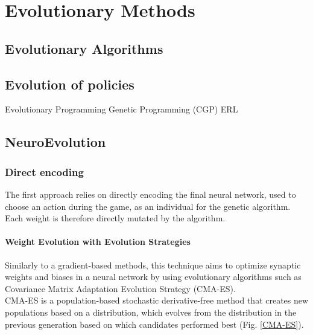 \chapter{Evolutionary Methods }
\label{sec:evo}

\section{Evolutionary Algorithms}

\section{Evolution of policies}
Evolutionary Programming
Genetic Programming (CGP)
ERL

\section{NeuroEvolution}
\subsection{Direct encoding}
The first approach relies on directly encoding the final neural network, used to choose an action during the game, as an individual for the genetic algorithm. Each weight is therefore directly mutated by the algorithm.

\subsubsection{Weight Evolution with Evolution Strategies}
Similarly to a gradient-based methods, this technique aims to optimize synaptic weights and biases in a neural network by using evolutionary algorithms such as Covariance Matrix Adaptation Evolution Strategy (CMA-ES). \cite{CMA-ES} \cite{CMAES-Atari}\\ 
CMA-ES is a population-based stochastic derivative-free method that creates new populations based on a distribution, which evolves from the distribution in the previous generation based on which candidates performed best (Fig. \ref{CMA-ES}).

